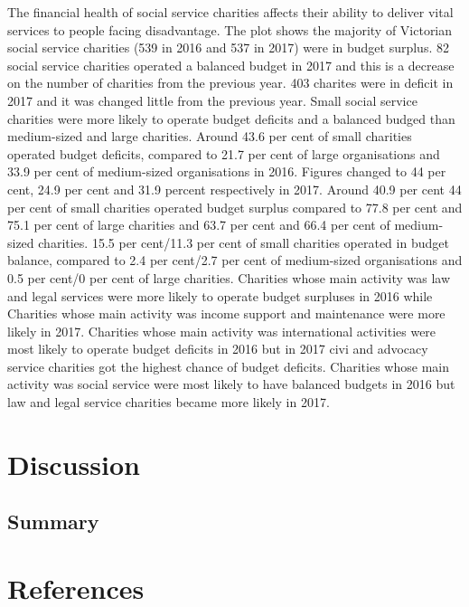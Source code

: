 \documentclass[
  11pt,
]{article}
\begin{document}
The financial health of social service charities affects their ability to deliver vital services to people facing disadvantage. The plot shows the majority of Victorian social service charities (539 in 2016 and 537 in 2017) were in budget surplus. 82 social service charities operated a balanced budget in 2017 and this is a decrease on the number of charities from the previous year. 403 charites were in deficit in 2017 and it was changed little from the previous year.
Small social service charities were more likely to operate budget deficits and a balanced budged than medium-sized and large charities. Around 43.6 per cent of small charities operated budget deficits, compared to 21.7 per cent of large organisations and 33.9 per cent of medium-sized organisations in 2016. Figures changed to 44 per cent, 24.9 per cent and 31.9 percent respectively in 2017.
Around 40.9 per cent 44 per cent of small charities operated budget surplus compared to 77.8 per cent and 75.1 per cent of large charities and 63.7 per cent and 66.4 per cent of medium-sized charities.
15.5 per cent/11.3 per cent of small charities operated in budget balance, compared to 2.4 per cent/2.7 per cent of medium-sized organisations and 0.5 per cent/0 per cent of large charities.
Charities whose main activity was law and legal services were more likely to operate budget surpluses in 2016 while Charities whose main activity was income support and maintenance were more likely in 2017. Charities whose main activity was international activities were most likely to operate budget deficits in 2016 but in 2017 civi and advocacy service charities got the highest chance of budget deficits. Charities whose main activity was social service were most likely to have balanced budgets in 2016 but law and legal service charities became more likely in 2017.

\hypertarget{discussion}{%
\section{Discussion}\label{discussion}}

\hypertarget{summary}{%
\subsection{Summary}\label{summary}}

\newpage
{}
\onecolumn

\hypertarget{references}{%
\section{References}\label{references}}
\end{document}
